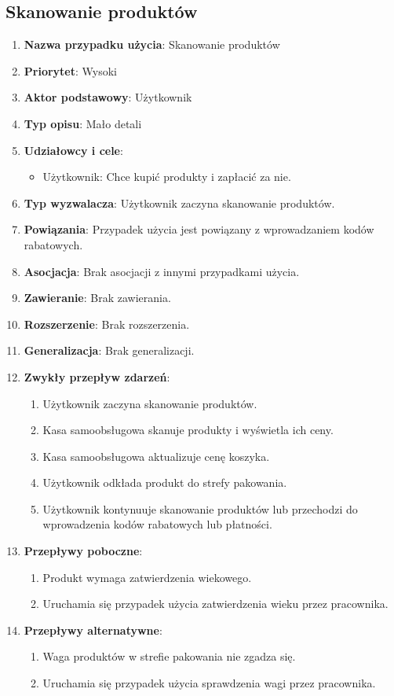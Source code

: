 \documentclass{article}
\begin{document}
\subsection{Skanowanie produktów}
\begin{enumerate}
\item \textbf{Nazwa przypadku użycia}: Skanowanie produktów
\item \textbf{Priorytet}: Wysoki
\item \textbf{Aktor podstawowy}: Użytkownik
\item \textbf{Typ opisu}: Mało detali
\item \textbf{Udziałowcy i cele}:
\begin{itemize}
\item Użytkownik: Chce kupić produkty i zapłacić za nie.
\end{itemize}
\item \textbf{Typ wyzwalacza}: Użytkownik zaczyna skanowanie produktów.
\item \textbf{Powiązania}: Przypadek użycia jest powiązany z wprowadzaniem kodów rabatowych.
\item \textbf{Asocjacja}: Brak asocjacji z innymi przypadkami użycia.
\item \textbf{Zawieranie}: Brak zawierania.
\item \textbf{Rozszerzenie}: Brak rozszerzenia.
\item \textbf{Generalizacja}: Brak generalizacji.
\item \textbf{Zwykły przepływ zdarzeń}:
\begin{enumerate}
\item Użytkownik zaczyna skanowanie produktów.
\item Kasa samoobsługowa skanuje produkty i wyświetla ich ceny.
\item Kasa samoobsługowa aktualizuje cenę koszyka.
\item Użytkownik odkłada produkt do strefy pakowania.
\item Użytkownik kontynuuje skanowanie produktów lub przechodzi do wprowadzenia kodów rabatowych lub płatności.
\end{enumerate}
\item \textbf{Przepływy poboczne}:
\begin{enumerate}
\item Produkt wymaga zatwierdzenia wiekowego.
\item Uruchamia się przypadek użycia zatwierdzenia wieku przez pracownika.
\end{enumerate}
\item \textbf{Przepływy alternatywne}:
\begin{enumerate}
\item Waga produktów w strefie pakowania nie zgadza się.
\item Uruchamia się przypadek użycia sprawdzenia wagi przez pracownika.
\end{enumerate}
\end{enumerate}
\end{document}
